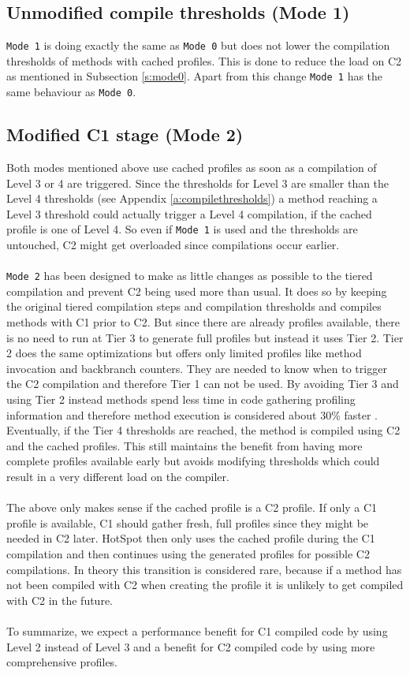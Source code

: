 \subsection{Unmodified compile thresholds (Mode 1)}
\label{s:mode1}
\texttt{Mode 1} is doing exactly the same as \texttt{Mode 0} but does not lower the compilation thresholds of methods with cached profiles.
This is done to reduce the load on C2 as mentioned in Subsection \ref{s:mode0}.
Apart from this change \texttt{Mode 1} has the same behaviour as \texttt{Mode 0}.
\subsection{Modified C1 stage (Mode 2)}
\label{s:mode2}
Both modes mentioned above use cached profiles as soon as a compilation of Level 3 or 4 are triggered. Since the thresholds for Level 3 are smaller than the Level 4 thresholds (see Appendix \ref{a:compilethresholds}) a method reaching a Level 3 threshold could actually trigger a Level 4 compilation, if the cached profile is one of Level 4. So even if \texttt{Mode 1} is used and the thresholds are untouched, C2 might get overloaded since compilations occur earlier.
\\\\
\texttt{Mode 2} has been designed to make as little changes as possible to the tiered compilation and prevent C2 being used more than usual. It does so by keeping the original tiered compilation steps and compilation thresholds and compiles methods with C1 prior to C2. But since there are already profiles available, there is no need to run at Tier 3 to generate full profiles but instead it uses Tier 2.
Tier 2 does the same optimizations but offers only limited profiles like method invocation and backbranch counters. They are needed to know when to trigger the C2 compilation and therefore Tier 1 can not be used. 
By avoiding Tier 3 and using Tier 2 instead methods spend less time in code gathering profiling information and therefore method execution is considered about 30\% faster \cite{code_atp_hpp}.
Eventually, if the Tier 4 thresholds are reached, the method is compiled using C2 and the cached profiles. This still maintains the benefit from having more complete profiles available early but avoids modifying thresholds which could result in a very different load on the compiler. 
\\\\
The above only makes sense if the cached profile is a C2 profile.
If only a C1 profile is available, C1 should gather fresh, full profiles since they might be needed in C2 later. HotSpot then only uses the cached profile during the C1 compilation and then continues using the generated profiles for possible C2 compilations.
In theory this transition is considered rare, because if a method has not been compiled with C2 when creating the profile it is unlikely to get compiled with C2 in the future.
\\\\
To summarize, we expect a performance benefit for C1 compiled code by using Level 2 instead of Level 3 and a benefit for C2 compiled code by using more comprehensive profiles.


